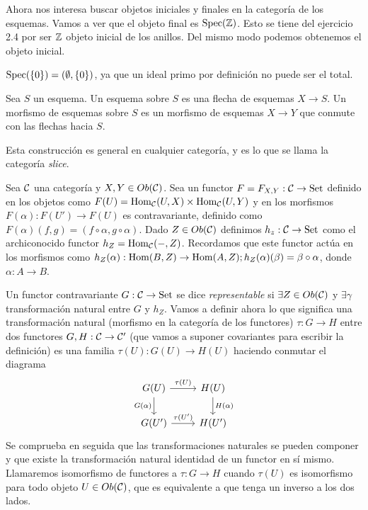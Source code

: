 \documentclass[GA.tex]{subfiles}
\begin{document}
Ahora nos interesa buscar objetos iniciales y finales en la categoría de los esquemas. Vamos a ver que el objeto final es $\operatorname{Spec}(\mathbb{Z})$. Esto se tiene del ejercicio 2.4 por ser $\mathbb{Z}$ objeto inicial de los anillos. Del mismo modo podemos obtenemos el objeto inicial. 
\
\begin{observacion}
$\operatorname{Spec}(\{0\})=(\emptyset,\{0\})$, ya que un ideal primo por definición no puede ser el total. 
\end{observacion}

\begin{defi}
Sea $S$ un esquema. Un esquema sobre $S$ es una flecha de esquemas $X\to S$. Un morfismo de esquemas sobre $S$ es un morfismo de esquemas $X\to Y$ que conmute con las flechas hacia $S$. 
\end{defi}

Esta construcción es general en cualquier categoría, y es lo que se llama la categoría \emph{slice}. 


Sea $\mathcal{C}$ una categoría y $X,Y\in Ob(\mathcal{C})$. Sea un functor $F=F_{X,Y}:\mathcal{C}\to\mathrm{Set}$ definido en los objetos como $F(U)=\operatorname{Hom}_{\mathcal{C}}(U,X)\times\operatorname{Hom}_{\mathcal{C}}(U,Y)$ y en los morfismos $F(\alpha):F(U')\to F(U)$ es contravariante, definido como $F(\alpha)(f,g)=(f\circ \alpha, g\circ\alpha)$. Dado $Z\in Ob(\mathcal{C})$ definimos $h_z:\mathcal{C}\to\mathrm{Set}$ como el archiconocido functor $h_Z=\operatorname{Hom}_{\mathcal{C}}(-,Z)$. Recordamos que este functor actúa en los morfismos como $h_Z(\alpha):\operatorname{Hom}(B,Z)\to \operatorname{Hom}(A,Z); h_Z(\alpha)(\beta)=\beta\circ\alpha$, donde $\alpha:A\to B$. 

\begin{defi}
Un functor contravariante $G:\mathcal{C}\to\mathrm{Set}$ se dice \emph{representable} si $\exists Z\in Ob(\mathcal{C})$ y $\exists\gamma$ transformación natural entre $G$ y $h_Z$. Vamos a definir ahora lo que significa una transformación natural (morfismo en la categoría de los functores) $\tau:G\to H$ entre dos functores $G,H:\mathcal{C}\to\mathcal{C}'$ (que vamos a suponer covariantes para escribir la definición) es una familia $\tau(U):G(U)\to H(U)$ haciendo conmutar el diagrama
\[
\begin{tikzcd}
G(U)\arrow[r, "\tau(U)"]\arrow[d, "G(\alpha)"'] & H(U)\arrow[d, "H(\alpha)"]\\
G(U')\arrow[r, "\tau(U')"] & H(U')
\end{tikzcd}
\]
Se comprueba en seguida que las transformaciones naturales se pueden componer y que existe la transformación natural identidad de un functor en sí mismo. Llamaremos isomorfismo de functores a $\tau:G\to H$ cuando $\tau(U)$ es isomorfismo para todo objeto $U\in Ob(\mathcal{C})$, que es equivalente a que tenga un inverso a los dos lados. 
\end{defi}
\end{document}
